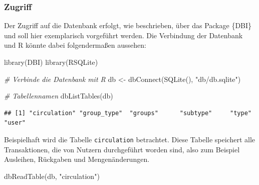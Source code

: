 \documentclass[
]{article}
\newenvironment{Shaded}{\begin{snugshade}}{\end{snugshade}}
\newcommand{\CommentTok}[1]{\textcolor[rgb]{0.56,0.35,0.01}{\textit{#1}}}
\newcommand{\FunctionTok}[1]{\textcolor[rgb]{0.00,0.00,0.00}{#1}}
\newcommand{\NormalTok}[1]{#1}
\newcommand{\OtherTok}[1]{\textcolor[rgb]{0.56,0.35,0.01}{#1}}
\newcommand{\StringTok}[1]{\textcolor[rgb]{0.31,0.60,0.02}{#1}}
\begin{document}
\hypertarget{zugriff}{%
\subsubsection{Zugriff}\label{zugriff}}

Der Zugriff auf die Datenbank erfolgt, wie beschrieben, über das Package \{DBI\}\autocite{R-DBI} und soll hier exemplarisch vorgeführt werden. Die Verbindung der Datenbank und R könnte dabei folgendermaßen aussehen:

\begin{Shaded}
\begin{Highlighting}[]
\FunctionTok{library}\NormalTok{(DBI)}
\FunctionTok{library}\NormalTok{(RSQLite)}

\CommentTok{\# Verbinde die Datenbank mit R}
\NormalTok{db }\OtherTok{\textless{}{-}} \FunctionTok{dbConnect}\NormalTok{(}\FunctionTok{SQLite}\NormalTok{(), }\StringTok{"db/db.sqlite"}\NormalTok{)}

\CommentTok{\# Tabellennamen}
\FunctionTok{dbListTables}\NormalTok{(db)}
\end{Highlighting}
\end{Shaded}

\begin{verbatim}
## [1] "circulation" "group_type"  "groups"      "subtype"     "type"        "user"
\end{verbatim}

Beispielhaft wird die Tabelle \texttt{circulation} betrachtet. Diese Tabelle speichert alle Transaktionen, die von Nutzern durchgeführt worden sind, also zum Beispiel Ausleihen, Rückgaben und Mengenänderungen.

\begin{Shaded}
\begin{Highlighting}[]
\FunctionTok{dbReadTable}\NormalTok{(db, }\StringTok{"circulation"}\NormalTok{)}
\end{Highlighting}
\end{Shaded}
\end{document}
